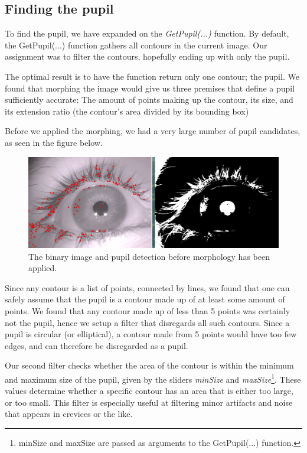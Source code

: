 \subsection{Finding the pupil}
To find the pupil, we have expanded on the \emph{GetPupil(...)} function.\newline
By default, the GetPupil(...) function gathers all contours in the current image. Our assignment was to filter the contours, hopefully ending up with only the pupil.\newline

The optimal result is to have the function return only one contour; the pupil. We found that morphing the image would give us three premises that define a pupil sufficiently accurate: The amount of points making up the contour, its size, and its extension ratio (the contour's area divided by its bounding box)\newline

Before we applied the morphing, we had a very large number of pupil candidates, as seen in the figure below.\newline

\begin{figure}[h]
	\centering
	\includegraphics[scale=0.35]{many_pupils.png}
	\caption{The binary image and pupil detection before morphology has been applied.}
\end{figure}

Since any contour is a list of points, connected by lines, we found that one can safely assume that the pupil is a contour made up of at least some amount of points. We found that any contour made up of less than 5 points was certainly not the pupil, hence we setup a filter that disregards all such contours. Since a pupil is circular (or elliptical), a contour made from 5 points would have too few edges, and can therefore be disregarded as a pupil.\newline

Our second filter checks whether the area of the contour is within the minimum and maximum size of the pupil, given by the sliders \emph{minSize} and \emph{maxSize}\footnote{minSize and maxSize are passed as arguments to the GetPupil(...) function.}. These values determine whether a specific contour has an area that is either too large, or too small. This filter is especially useful at filtering minor artifacts and noise that appears in crevices or the like.\newline

